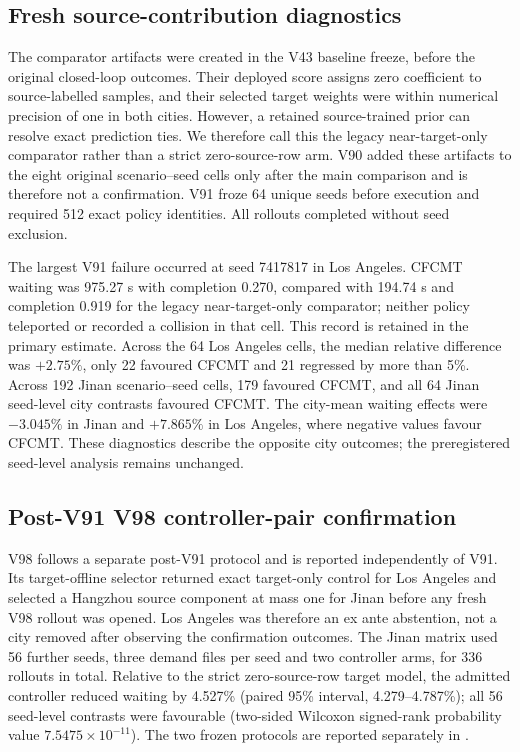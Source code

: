 \subsection{Fresh source-contribution diagnostics}
\label{sec:supp-source-diagnostics}

The comparator artifacts were created in the V43 baseline freeze, before the
original closed-loop outcomes.  Their deployed score assigns zero coefficient
to source-labelled samples, and their selected target weights were within
numerical precision of one in both cities.  However, a retained source-trained
prior can resolve exact prediction ties.  We therefore call this the legacy
near-target-only comparator rather than a strict zero-source-row arm.  V90
added these artifacts to the eight original scenario--seed cells only after
the main comparison and is therefore not a confirmation.  V91 froze 64 unique
seeds before execution and required 512 exact policy identities.  All rollouts
completed without seed exclusion.

The largest V91 failure occurred at seed 7417817 in Los Angeles.  CFCMT waiting
was 975.27 s with completion 0.270, compared with 194.74 s and completion 0.919
for the legacy near-target-only comparator; neither policy teleported or
recorded a collision in that cell.  This record is retained in the primary
estimate.  Across the 64 Los
Angeles cells, the median relative difference was $+2.75\%$, only 22 favoured
CFCMT and 21 regressed by more than 5\%.  Across 192 Jinan scenario--seed cells,
179 favoured CFCMT, and all 64 Jinan seed-level city contrasts favoured CFCMT.
The city-mean waiting effects were $-3.045\%$ in Jinan and $+7.865\%$ in Los
Angeles, where negative values favour CFCMT.  These diagnostics describe the
opposite city outcomes; the preregistered seed-level analysis remains unchanged.

\subsection{Post-V91 V98 controller-pair confirmation}
\label{sec:supp-v98-confirmation}

V98 follows a separate post-V91 protocol and is reported independently of V91.
Its target-offline selector returned exact target-only control for Los Angeles
and selected a Hangzhou source component at mass one for Jinan before any fresh
V98 rollout was opened.  Los Angeles was therefore an ex ante abstention, not
a city removed after observing the confirmation outcomes.  The Jinan matrix
used 56 further seeds, three demand files per seed and two controller arms, for
336 rollouts in total.  Relative to the strict zero-source-row target model,
the admitted controller reduced waiting by 4.527\% (paired 95\% interval,
4.279--4.787\%); all 56 seed-level contrasts were favourable (two-sided
Wilcoxon signed-rank probability value $7.5475\times10^{-11}$).  The two frozen protocols
are reported separately in
.

